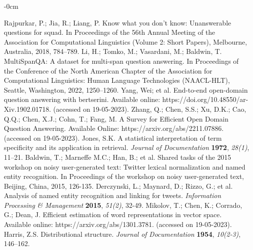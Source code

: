 \documentclass[mathematics,article,submit,moreauthors]{Definitions/mdpi}
\newcommand{\1}[1]{\mathds{1}\left[#1\right]}
\begin{document}
\begin{adjustwidth}{-\extralength}{0cm}
\begin{thebibliography}{999}
	Rajpurkar, P.; Jia, R.; Liang, P. Know what you don’t know: Unanswerable questions for squad. In Proceedings of the 56th Annual Meeting of the Association for Computational Linguistics (Volume 2: Short Papers), Melbourne, Australia, 2018, 784–789.
	Li, H.; Tomko, M.; Vasardani, M.; Baldwin, T. MultiSpanQA: A dataset for multi-span question answering. In Proceedings of the Conference of the North American Chapter of the Association for Computational Linguistics: Human Language Technologies (NAACL-HLT), Seattle, Washington, 2022, 1250–1260.
	Yang, Wei; et al. End-to-end open-domain question answering with bertserini. Available online: https://doi.org/10.48550/ar-\\Xiv.1902.01718. (accessed on 19-05-2023).
	Zhang, Q.; Chen, S.S.; Xu, D.K.; Cao, Q.Q.; Chen, X.J.; Cohn, T.; Fang, M. A Survey for Efficient Open Domain Question Answering. Available Online: https://arxiv.org/abs/2211.07886. (accessed on 19-05-2023).
	Jones, S.K. A statistical interpretation of term specificity and its application in retrieval. {\em Journal of Documentation} {\bf 1972}, {\em 28(1)}, 11--21.
	Baldwin, T.; Marneffe M.C.; Han, B.; et al. Shared tasks of the 2015 workshop on noisy user-generated text: Twitter lexical normalization and named entity recognition. In Proceedings of the workshop on noisy user-generated text, Beijing, China, 2015, 126-135.
	Derczynski, L.; Maynard, D.; Rizzo, G.; et al. Analysis of named entity recognition and linking for tweets. {\em Information Processing \& Management} {\bf 2015}, {\em 51(2)}, 32-49.
	Mikolov, T.; Chen, K.; Corrado, G.; Dean, J. Efficient estimation of word representations in vector space. Available online: https://arxiv.org/abs/1301.3781. (accessed on 19-05-2023).
	Harris, Z.S. Distributional structure. {\em Journal of Documentation} {\bf 1954}, {\em 10(2-3)}, 146--162.

\end{thebibliography}
\end{adjustwidth}
\end{document}
